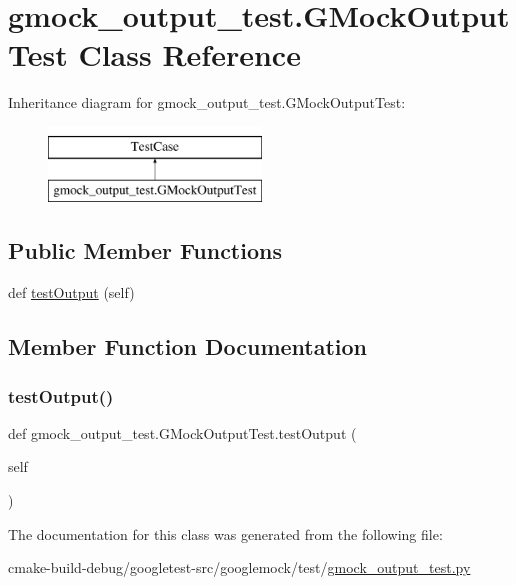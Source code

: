 \hypertarget{classgmock__output__test_1_1GMockOutputTest}{}\section{gmock\+\_\+output\+\_\+test.\+G\+Mock\+Output\+Test Class Reference}
\label{classgmock__output__test_1_1GMockOutputTest}
Inheritance diagram for gmock\+\_\+output\+\_\+test.\+G\+Mock\+Output\+Test\+:\begin{figure}[H]
\begin{center}
\leavevmode
\includegraphics[height=2.000000cm]{classgmock__output__test_1_1GMockOutputTest}
\end{center}
\end{figure}
\subsection*{Public Member Functions}
\begin{DoxyCompactItemize}
\item 
def \mbox{\hyperlink{classgmock__output__test_1_1GMockOutputTest_a661e7846690f48328fd9e0834fde9980}{test\+Output}} (self)
\end{DoxyCompactItemize}


\subsection{Member Function Documentation}
\mbox{\label{classgmock__output__test_1_1GMockOutputTest_a661e7846690f48328fd9e0834fde9980}} 
\subsubsection{\texorpdfstring{testOutput()}{testOutput()}}
{\footnotesize\ttfamily def gmock\+\_\+output\+\_\+test.\+G\+Mock\+Output\+Test.\+test\+Output (\begin{DoxyParamCaption}\item[{}]{self }\end{DoxyParamCaption})}



The documentation for this class was generated from the following file\+:\begin{DoxyCompactItemize}
\item 
cmake-\/build-\/debug/googletest-\/src/googlemock/test/\mbox{\hyperlink{gmock__output__test_8py}{gmock\+\_\+output\+\_\+test.\+py}}\end{DoxyCompactItemize}

